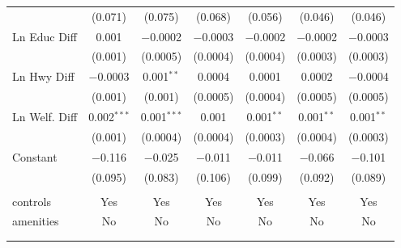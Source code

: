 \begin{table}[!htbp]
\begin{tabular}{@{\extracolsep{5pt}}lcccccc}
  & (0.071) & (0.075) & (0.068) & (0.056) & (0.046) & (0.046) \\ 
  Ln Educ Diff & 0.001 & $-$0.0002 & $-$0.0003 & $-$0.0002 & $-$0.0002 & $-$0.0003 \\ 
  & (0.001) & (0.0005) & (0.0004) & (0.0004) & (0.0003) & (0.0003) \\ 
  Ln Hwy Diff & $-$0.0003 & 0.001$^{**}$ & 0.0004 & 0.0001 & 0.0002 & $-$0.0004 \\ 
  & (0.001) & (0.001) & (0.0005) & (0.0004) & (0.0005) & (0.0005) \\ 
  Ln Welf. Diff & 0.002$^{***}$ & 0.001$^{***}$ & 0.001 & 0.001$^{**}$ & 0.001$^{**}$ & 0.001$^{**}$ \\ 
  & (0.001) & (0.0004) & (0.0004) & (0.0003) & (0.0004) & (0.0003) \\ 
  Constant & $-$0.116 & $-$0.025 & $-$0.011 & $-$0.011 & $-$0.066 & $-$0.101 \\ 
  & (0.095) & (0.083) & (0.106) & (0.099) & (0.092) & (0.089) \\ 
 \hline \\[-1.8ex] 
controls & Yes & Yes & Yes & Yes & Yes & Yes \\ 
amenities & No & No & No & No & No & No \\ 
\hline \\[-1.8ex] 
\hline 
\hline \\[-1.8ex] 
\end{tabular} 
\end{table} 
